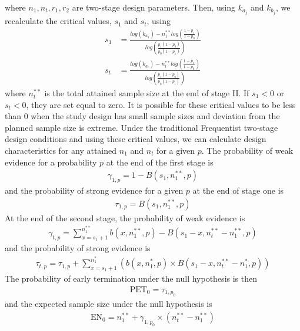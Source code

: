 \documentclass[12pt]{report}\usepackage[]{graphicx}\usepackage[]{color}
\newlength{\li}\setlength{\li}{14.48pt}
\newlength{\di}\setlength{\di}{-3.5mm}
\begin{document}
where $n_1, n_t, r_1, r_2$ are two-stage design parameters. Then, using $k_{a_j}$ and $k_{b_j}$, we recalculate the critical values, $s_1$ and $s_t$, using
\begin{equation}
\begin{aligned}
s_1 &= \frac{log(k_{a_1}) - n_1^{\ast\ast} log\left(\frac{1-p_1}{1-p_0}\right)}{log\left(\frac{p_1(1-p_0)}{p_0(1-p_1)}\right)} \\
s_t &= \frac{log(k_{a_t}) - n_t^{\ast\ast} log\left(\frac{1-p_1}{1-p_0}\right)}{log\left(\frac{p_1(1-p_0)}{p_0(1-p_1)}\right)}
\end{aligned}
\end{equation}
where $n_t^{\ast\ast}$ is the total attained sample size at the end of stage II. If $s_1 < 0$ or $s_t < 0$, they are set equal to zero. It is possible for these critical values to be less than 0 when the study design has small sample sizes and deviation from the planned sample size is extreme. Under the traditional Frequentist two-stage design conditions and using these critical values, we can calculate design characteristics for any attained $n_1$ and $n_t$ for a given $p$. The probability of weak evidence for a probability $p$ at the end of the first stage is 
\begin{equation}
\begin{aligned}
\gamma_{1,p} = 1 - B(s_1, n_1^{\ast\ast}, p)
\end{aligned}
\end{equation}
and the probability of strong evidence for a given $p$ at the end of stage one is 
\begin{equation}
\begin{aligned}
\tau_{1,p} = B(s_1, n_1^{\ast\ast}, p)
\end{aligned}
\end{equation}
At the end of the second stage, the probability of weak evidence is 
\begin{equation}
\begin{aligned}
\gamma_{t,p} = \sum_{x=s_1+1}^{n_1^{\ast\ast}} b(x, n_1^{\ast\ast}, p) - B(s_1 - x, n_t^{\ast\ast} - n_1^{\ast\ast}, p)
\end{aligned}
\end{equation}
and the probability of strong evidence is 
\begin{equation}
\begin{aligned}
\tau_{t,p} = \tau_{1,p} + \sum_{x=s_1+1}^{n_1^\ast} \left( b(x,n_1^\ast,p) \times B(s_1 - x, n_t^{\ast\ast}-n_1^\ast, p) \right)
\end{aligned}
\end{equation}
The probability of early termination under the null hypothesis is then 
\begin{equation}
\begin{aligned}
\mbox{PET}_0 = \tau_{1,p_0}
\end{aligned}
\end{equation}
and the expected sample size under the null hypothesis is 
\begin{equation}
\begin{aligned}
\mbox{EN}_0 = n_1^{\ast\ast} + \gamma_{1,p_0} \times (n_t^{\ast\ast} - n_1^{\ast\ast})
\end{aligned}
\end{equation}
\end{document}
